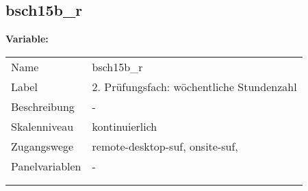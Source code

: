 	
	
	\subsection{bsch15b\_r}
	\label{subSection:bsch15b_r}

	\noindent\textbf{Variable:}\\
		\begin{tabular}{lL{11.3cm}}
			\label{tableVariable:bsch15b_r}
			Name & bsch15b\_r \\
			Label & 2. Prüfungsfach: wöchentliche Stundenzahl \\
			Beschreibung & - \\
			Skalenniveau & kontinuierlich \\
			Zugangswege &
				remote-desktop-suf,
				onsite-suf,
 \\
			Panelvariablen & -
			 \\
			 \\
 \\
		\end{tabular}





